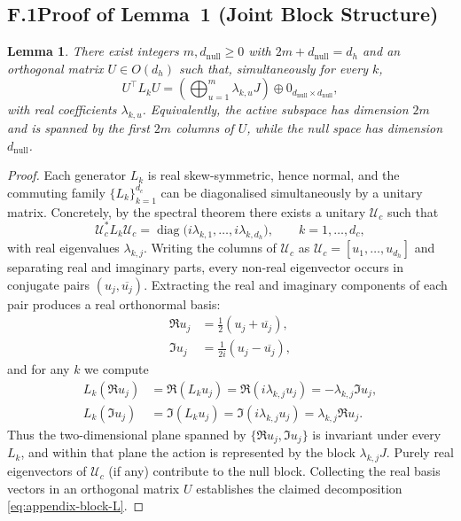 \documentclass[11pt]{article}
\newtheorem{lemma}{Lemma}
\begin{document}
\subsection*{F.1\quad Proof of Lemma~1 (Joint Block Structure)}

\begin{lemma}\label{lem:appendix-block-structure}
There exist integers $m,d_{\mathrm{null}}\ge 0$ with $2m+d_{\mathrm{null}} = d_h$ and an orthogonal
matrix $U\in O(d_h)$ such that, simultaneously for every $k$,
\begin{equation}
  U^\top L_k U =
  \left(\bigoplus_{u=1}^{m} \lambda_{k,u} J\right)
  \oplus 0_{d_{\mathrm{null}}\times d_{\mathrm{null}}},
  \label{eq:appendix-block-L}
\end{equation}
with real coefficients $\lambda_{k,u}$.  Equivalently, the active subspace has dimension $2m$ and is
spanned by the first $2m$ columns of $U$, while the null space has dimension $d_{\mathrm{null}}$.
\end{lemma}

\begin{proof}
Each generator $L_k$ is real skew-symmetric, hence normal, and the commuting family
$\{L_k\}_{k=1}^{d_c}$ can be diagonalised simultaneously by a unitary matrix.  Concretely, by the
spectral theorem there exists a unitary $\mathcal{U}_c$ such that
\begin{equation}
  \mathcal{U}_c^* L_k \mathcal{U}_c
  = \operatorname{diag}\big(i\lambda_{k,1},\dots,i\lambda_{k,d_h}\big),
  \qquad k=1,\dots,d_c,
  \label{eq:appendix-unitary-diagonalisation}
\end{equation}
with real eigenvalues $\lambda_{k,j}$.  Writing the columns of $\mathcal{U}_c$ as
$\mathcal{U}_c = [u_1,\dots,u_{d_h}]$ and separating real and imaginary parts,
every non-real eigenvector occurs in conjugate pairs $(u_j,\overline{u_j})$.  Extracting the real and
imaginary components of each pair produces a real orthonormal basis:
\begin{align}
  \Re u_j &= \frac{1}{2}(u_j + \overline{u_j}),\\
  \Im u_j &= \frac{1}{2i}(u_j - \overline{u_j}),
\end{align}
and for any $k$ we compute
\begin{align}
  L_k (\Re u_j)
  &= \Re (L_k u_j)
   = \Re (i\lambda_{k,j} u_j)
   = -\lambda_{k,j} \Im u_j,\\
  L_k (\Im u_j)
  &= \Im (L_k u_j)
   = \Im (i\lambda_{k,j} u_j)
   = \lambda_{k,j} \Re u_j.
\end{align}
Thus the two-dimensional plane spanned by $\{\Re u_j,\Im u_j\}$ is invariant under every $L_k$, and
within that plane the action is represented by the block $\lambda_{k,j} J$.  Purely real eigenvectors
of $\mathcal{U}_c$ (if any) contribute to the null block.  Collecting the real basis vectors in an
orthogonal matrix $U$ establishes the claimed decomposition \eqref{eq:appendix-block-L}.
\end{proof}
\end{document}

